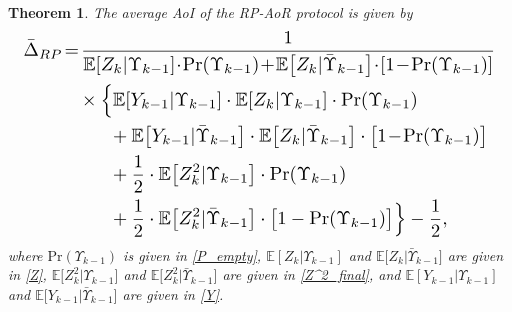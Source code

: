 \documentclass{IEEEtran}
\newtheorem{theorem}{Theorem}
\begin{document}
\begin{theorem}\label{Theorem 3}
	The average AoI of the RP-AoR protocol is given by
\begin{equation}
	\resizebox{.98\hsize}{!}{$\begin{aligned}
			\bar{\Delta}_{RP}&\!=\!\frac{1}{\mathbb{E}[Z_k|\Upsilon_{k-1}]\!\cdot\! \mathrm{Pr}(\Upsilon_{k-1})\!+\!\mathbb{E}\big[Z_k|\bar{\Upsilon}_{k-1}\big]\!\cdot\! [1\!-\!\mathrm{Pr}(\Upsilon_{k-1})]}\\
			&\quad\!\times\Big\{\mathbb{E}[Y_{k-1}|\Upsilon_{k-1}]\cdot\mathbb{E}[Z_k|\Upsilon_{k-1}]\cdot \mathrm{Pr}(\Upsilon_{k-1})\\
			&\quad\quad \quad \!\!\! +\mathbb{E}\big[Y_{k-1}|\bar{\Upsilon}_{k-1}\big]\cdot\mathbb{E}\big[Z_k|\bar{\Upsilon}_{k-1}\big]\cdot \big[1\!-\!\mathrm{Pr}(\Upsilon_{k-1})\big]\\\
			&\quad \quad \quad \!\!\! +\frac{1}{2}\cdot \mathbb{E}\big[Z_k^2|\Upsilon_{k-1}\big]\cdot\mathrm{Pr}(\Upsilon_{k-1})\\
			&\quad \quad \quad \!\!\!+\frac{1}{2}\cdot \mathbb{E}\big[Z_k^2|\bar{\Upsilon}_{k-1}\big]\cdot\big[1-\mathrm{Pr}(\Upsilon_{k-1})\big]\Big\}-\frac{1}{2},
	\end{aligned}$}
\end{equation}
		\noindent where $\mathrm{Pr}(\Upsilon_{k-1})$ is given in \eqref{P_empty}, $\mathbb{E}[Z_k|\Upsilon_{k-1}]$ and $\mathbb{E}\big[Z_k|\bar{\Upsilon}_{k-1}\big]$ are given in \eqref{Z}, $\mathbb{E}\big[Z_k^2|\Upsilon_{k-1}\big]$ and $\mathbb{E}\big[Z_k^2|\bar{\Upsilon}_{k-1}\big]$ are given in \eqref{Z^2_final}, and $\mathbb{E}[Y_{k-1}|\Upsilon_{k-1}]$ and $\mathbb{E}\big[Y_{k-1}|\bar{\Upsilon}_{k-1}\big]$ are given in \eqref{Y}.
		

\end{theorem}
\end{document}
